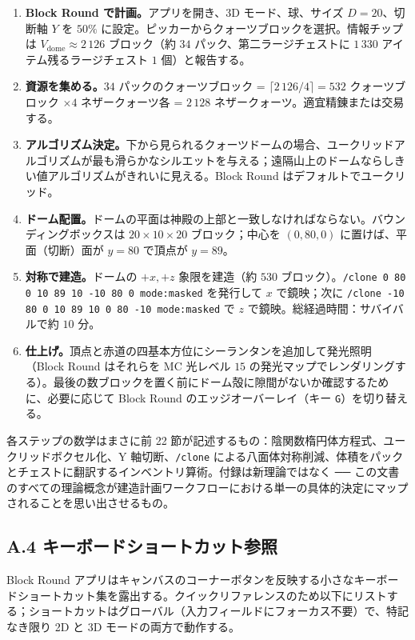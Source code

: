 \documentclass[12pt,a4paper]{scrartcl}
\newcommand{\code}[1]{\texttt{\small #1}}
\newcommand{\cmd}[1]{\textcolor{earth}{\texttt{\small #1}}}
\begin{document}
\begin{enumerate}[leftmargin=1.6em,itemsep=0.3em,topsep=0.3em]
  \item \textbf{Block Round で計画。}アプリを開き、3D モード、球、サイズ $D=20$、切断軸 $Y$ を $50\%$ に設定。ピッカーからクォーツブロックを選択。情報チップは $V_{\mathrm{dome}} \approx 2\,126$ ブロック（約 $34$ パック、第二ラージチェストに $1\,330$ アイテム残るラージチェスト $1$ 個）と報告する。
  \item \textbf{資源を集める。}$34$ パックのクォーツブロック = $\lceil 2\,126/4 \rceil = 532$ クォーツブロック $\times 4$ ネザークォーツ各 = $2\,128$ ネザークォーツ。適宜精錬または交易する。
  \item \textbf{アルゴリズム決定。}下から見られるクォーツドームの場合、ユークリッドアルゴリズムが最も滑らかなシルエットを与える；遠隔山上のドームならしきい値アルゴリズムがきれいに見える。Block Round はデフォルトでユークリッド。
  \item \textbf{ドーム配置。}ドームの平面は神殿の上部と一致しなければならない。バウンディングボックスは $20 \times 10 \times 20$ ブロック；中心を $(0,80,0)$ に置けば、平面（切断）面が $y=80$ で頂点が $y=89$。
  \item \textbf{対称で建造。}ドームの $+x, +z$ 象限を建造（約 $530$ ブロック）。\cmd{/clone 0 80 0 10 89 10 -10 80 0 mode:masked} を発行して $x$ で鏡映；次に \cmd{/clone -10 80 0 10 89 10 0 80 -10 mode:masked} で $z$ で鏡映。総経過時間：サバイバルで約 $10$ 分。
  \item \textbf{仕上げ。}頂点と赤道の四基本方位にシーランタンを追加して発光照明（Block Round はそれらを MC 光レベル $15$ の発光マップでレンダリングする）。最後の数ブロックを置く前にドーム殻に隙間がないか確認するために、必要に応じて Block Round のエッジオーバーレイ（キー \code{G}）を切り替える。
\end{enumerate}

各ステップの数学はまさに前 22 節が記述するもの：陰関数楕円体方程式、ユークリッドボクセル化、Y 軸切断、\cmd{/clone} による八面体対称削減、体積をパックとチェストに翻訳するインベントリ算術。付録は新理論ではなく ── この文書のすべての理論概念が建造計画ワークフローにおける単一の具体的決定にマップされることを思い出させるもの。

\subsection*{A.4 キーボードショートカット参照}

Block Round アプリはキャンバスのコーナーボタンを反映する小さなキーボードショートカット集を露出する。クイックリファレンスのため以下にリストする；ショートカットはグローバル（入力フィールドにフォーカス不要）で、特記なき限り 2D と 3D モードの両方で動作する。
\end{document}
